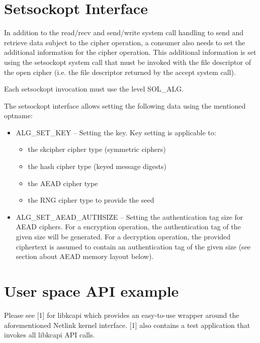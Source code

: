 \documentclass[a4paper,8pt,english]{sphinxmanual}
\begin{document}
\section{Setsockopt Interface}
\label{crypto/userspace-if:setsockopt-interface}
In addition to the read/recv and send/write system call handling to send
and retrieve data subject to the cipher operation, a consumer also needs
to set the additional information for the cipher operation. This
additional information is set using the setsockopt system call that must
be invoked with the file descriptor of the open cipher (i.e. the file
descriptor returned by the accept system call).

Each setsockopt invocation must use the level SOL\_ALG.

The setsockopt interface allows setting the following data using the
mentioned optname:
\begin{itemize}
\item {} 
ALG\_SET\_KEY -- Setting the key. Key setting is applicable to:
\begin{itemize}
\item {} 
the skcipher cipher type (symmetric ciphers)

\item {} 
the hash cipher type (keyed message digests)

\item {} 
the AEAD cipher type

\item {} 
the RNG cipher type to provide the seed

\end{itemize}

\item {} 
ALG\_SET\_AEAD\_AUTHSIZE -- Setting the authentication tag size for
AEAD ciphers. For a encryption operation, the authentication tag of
the given size will be generated. For a decryption operation, the
provided ciphertext is assumed to contain an authentication tag of
the given size (see section about AEAD memory layout below).

\end{itemize}


\section{User space API example}
\label{crypto/userspace-if:user-space-api-example}
Please see {[}1{]} for libkcapi which provides an easy-to-use wrapper around
the aforementioned Netlink kernel interface. {[}1{]} also contains a test
application that invokes all libkcapi API calls.
\end{document}
